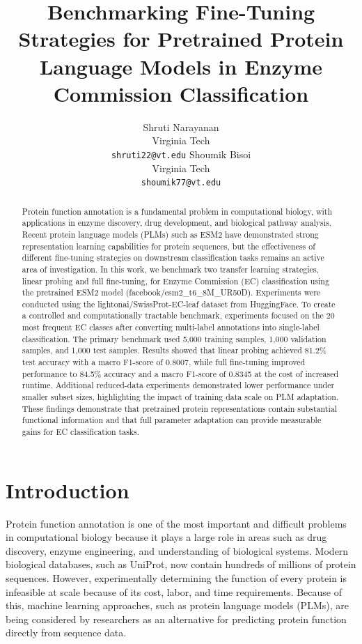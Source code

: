 \documentclass{article}
\title{Benchmarking Fine-Tuning Strategies for Pretrained Protein Language Models in Enzyme Commission Classification}
\author{
Shruti Narayanan \\
Virginia Tech \\
\texttt{shruti22@vt.edu}
\And
Shoumik Bisoi \\
Virginia Tech \\
\texttt{shoumik77@vt.edu}
}
\begin{document}
\maketitle

\begin{abstract}

Protein function annotation is a fundamental problem in computational biology, with applications in enzyme discovery, drug development, and biological pathway analysis. Recent protein language models (PLMs) such as ESM2 have demonstrated strong representation learning capabilities for protein sequences, but the effectiveness of different fine-tuning strategies on downstream classification tasks remains an active area of investigation. In this work, we benchmark two transfer learning strategies, linear probing and full fine-tuning, for Enzyme Commission (EC) classification using the pretrained ESM2 model (facebook/esm2\_t6\_8M\_UR50D). Experiments were conducted using the lightonai/SwissProt-EC-leaf dataset from HuggingFace. To create a controlled and computationally tractable benchmark, experiments focused on the 20 most frequent EC classes after converting multi-label annotations into single-label classification. The primary benchmark used 5,000 training samples, 1,000 validation samples, and 1,000 test samples. Results showed that linear probing achieved 81.2\% test accuracy with a macro F1-score of 0.8007, while full fine-tuning improved performance to 84.5\% accuracy and a macro F1-score of 0.8345 at the cost of increased runtime. Additional reduced-data experiments demonstrated lower performance under smaller subset sizes, highlighting the impact of training data scale on PLM adaptation. These findings demonstrate that pretrained protein representations contain substantial functional information and that full parameter adaptation can provide measurable gains for EC classification tasks.


\end{abstract}

\section{Introduction}
Protein function annotation is one of the most important and difficult problems in computational biology because it plays a large role in areas such as drug discovery, enzyme engineering, and understanding of biological systems. Modern biological databases, such as UniProt, now contain hundreds of millions of protein sequences. However, experimentally determining the function of every protein is infeasible at scale because of its cost, labor, and time requirements. Because of this, machine learning approaches, such as protein language models (PLMs), are being considered by researchers as an alternative for predicting protein function directly from sequence data.
\end{document}
